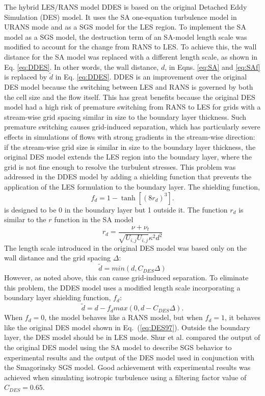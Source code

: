 The hybrid LES/RANS model DDES is based on the original Detached Eddy Simulation (DES) model\cite{DES97}. It uses the SA one-equation turbulence model in URANS mode and as a SGS model for the LES region. To implement the SA model as a SGS model, the destruction term of an SA-model length scale was modified to account for the change from RANS to LES. To achieve this, the wall distance for the SA model was replaced with a different length scale, as shown in Eq. \ref{eq:DDES}. In other words, the wall distance, $d$, in Eqns. \ref{eq:SA} and \ref{eq:SAf} is replaced by $\tilde{d}$ in Eq. \ref{eq:DDES}. DDES is an improvement over the original DES model because the switching between LES and RANS is governed by both the cell size and the flow itself. This has great benefits because the original DES model had a high risk of premature switching from RANS to LES for grids with a stream-wise grid spacing similar in size to the boundary layer thickness. Such premature switching causes grid-induced separation\cite{DDES}, which has particularly severe effects in simulations of flows with strong gradients in the stream-wise direction: if the stream-wise grid size is similar in size to the boundary layer thickness, the original DES model extends the LES region into the boundary layer, where the grid is not fine enough to resolve the turbulent stresses. This problem was addressed in the DDES model by adding a shielding function that prevents the application of the LES formulation to the boundary layer. The shielding function,
\begin{equation}
  f_d = 1-\tanh\left[(8r_d)^3\right].
  \label{eq:fd}
\end{equation}
is designed to be 0 in the boundary layer but 1 outside it. The function $r_d$ is similar to the $r$ function in the SA model\cite{SA}
\begin{equation}
  r_d = \frac{\nu+\nu_t}{\sqrt{U_{i,j}U_{i,j}}\kappa^2 d^2}
  \label{eq:rd}
\end{equation}
The length scale introduced in the original DES model was based only on the wall distance and the grid spacing $\Delta$:
\begin{equation}
  \tilde{d}=min(d,C_{DES}\Delta)
  \label{eq:DES97}
\end{equation}
However, as noted above, this can cause grid-induced separation. To eliminate this problem, the DDES model uses a modified length scale incorporating a boundary layer shielding function, $f_d$: 
\begin{equation}
  \tilde{d} = d-f_dmax(0,d-C_{DES}\Delta).
  \label{eq:DDES}
\end{equation}
When $f_d=0$, the model behaves like a RANS model, but when $f_d=1$, it behaves like the original DES model shown in Eq.~(\ref{eq:DES97}). Outside the boundary layer, the DES model should be in LES mode. Shur et al.\cite{DES99} compared the output of the original DES model using the SA model to describe SGS behavior to experimental results and the output of the DES model used in conjunction with the Smagorinsky SGS model. Good achievement with experimental results was achieved when simulating isotropic turbulence using a filtering factor value of $C_{DES}=0.65$.

